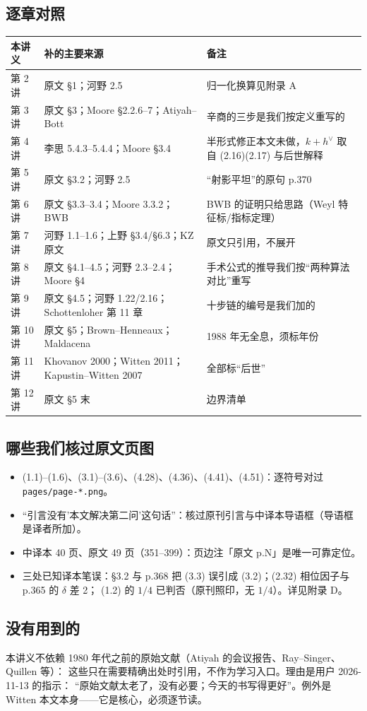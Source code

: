 \subsection{逐章对照}
\begin{center}
\begin{tabular}{@{}p{1.4cm}p{5.0cm}p{5.6cm}@{}}
\toprule
本讲义 & 补的主要来源 & 备注 \\
\midrule
第 2 讲 & 原文 \S1；河野 2.5 & 归一化换算见附录 A \\
第 3 讲 & 原文 \S3；Moore \S2.2.6--7；Atiyah--Bott & 辛商的三步是我们按定义重写的 \\
第 4 讲 & 李思 5.4.3--5.4.4；Moore \S3.4 & 半形式修正本文未做，$k+h^\vee$ 取自 (2.16)(2.17) 与后世解释 \\
第 5 讲 & 原文 \S3.2；河野 2.5 & “射影平坦”的原句 p.370 \\
第 6 讲 & 原文 \S3.3--3.4；Moore 3.3.2；BWB & BWB 的证明只给思路（Weyl 特征标/指标定理） \\
第 7 讲 & 河野 1.1--1.6；上野 \S3.4/\S6.3；KZ 原文 & 原文只引用，不展开 \\
第 8 讲 & 原文 \S4.1--4.5；河野 2.3--2.4；Moore \S4 & 手术公式的推导我们按“两种算法对比”重写 \\
第 9 讲 & 原文 \S4.5；河野 1.22/2.16；Schottenloher 第 11 章 & 十步链的编号是我们加的 \\
第 10 讲 & 原文 \S5；Brown--Henneaux；Maldacena & 1988 年无全息，须标年份 \\
第 11 讲 & Khovanov 2000；Witten 2011；Kapustin--Witten 2007 & 全部标“后世” \\
第 12 讲 & 原文 \S5 末 & 边界清单 \\
\bottomrule
\end{tabular}
\end{center}

\subsection{哪些我们核过原文页图}
\begin{itemize}
  \item (1.1)--(1.6)、(3.1)--(3.6)、(4.28)、(4.36)、(4.41)、(4.51)：逐符号对过 \texttt{pages/page-*.png}。
  \item “引言没有'本文解决第二问'这句话”：核过原刊引言与中译本导语框（导语框是译者所加）。
  \item 中译本 40 页、原文 49 页（351--399）：页边注「原文 p.N」是唯一可靠定位。
  \item 三处已知译本笔误：§3.2 与 p.368 把 (3.3) 误引成 (3.2)；(2.32) 相位因子与 p.365 的 $\delta$ 差 2；
        (1.2) 的 $1/4$ 已判否（原刊照印，无 $1/4$）。详见附录 D。
\end{itemize}

\subsection{没有用到的}
本讲义不依赖 1980 年代之前的原始文献（Atiyah 的会议报告、Ray--Singer、Quillen 等）：
这些只在需要精确出处时引用，不作为学习入口。理由是用户 2026-11-13 的指示：
“原始文献太老了，没有必要；今天的书写得更好”。例外是 Witten 本文本身——它是核心，必须逐节读。
